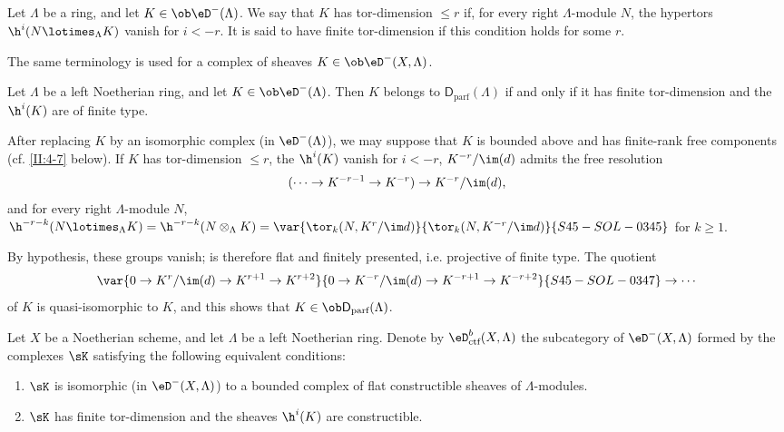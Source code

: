 \subsection{}\label{II:4-5}

Let $\Lambda$ be a ring, and let $K\in\ob\eD^-(\Lambda)$. We say that $K$
has tor-dimension $\leqslant r$ if, for every right $\Lambda$-module $N$, the
hypertors $\h^i(N\lotimes_\Lambda K)$ vanish for $i<-r$. It is said to have
finite tor-dimension if this condition holds for some $r$.

The same terminology is used for a complex of sheaves
$K\in\ob\eD^-(X,\Lambda)$.






\begin{lemma}\label{II:4-5-1}
Let $\Lambda$ be a left Noetherian ring, and let
$K\in\ob\eD^-(\Lambda)$. Then $K$ belongs to
$\mathsf{D}_\text{parf}(\Lambda)$ if and only if it has finite tor-dimension
and the $\h^i(K)$ are of finite type.
\end{lemma}

After replacing $K$ by an isomorphic complex (in $\eD^-(\Lambda)$), we may
suppose that $K$ is bounded above and has finite-rank free components (cf.
\ref{II:4-7} below). If $K$ has tor-dimension $\leqslant r$, the
$\h^i(K)$ vanish for $i<-r$, $K^{-r}/\im(d)$ admits the free resolution
\[
  (\cdots \to K^{-r-1} \to K^{-r}) \to K^{-r}/\im(d) \text{,}
\]
and for every right $\Lambda$-module $N$,
$\h^{-r-k}(N\lotimes_\Lambda K) = \h^{-r-k}(N\otimes_\Lambda K)
= \var{\tor_k(N,K^r/\im d)}{\tor_k(N,K^{-r}/\im d)}{S45-SOL-0345}$ for $k\geqslant 1$.

By hypothesis, these groups vanish;  is therefore
flat and finitely presented, i.e. projective of finite type. The quotient
\[
  \var{0 \to K^r/\im(d) \to K^{r+1} \to K^{r+2}}{0 \to K^{-r}/\im(d) \to K^{-r+1} \to K^{-r+2}}{S45-SOL-0347}\to \cdots
\]
of $K$ is quasi-isomorphic to $K$, and this shows that
$K\in\ob\mathsf{D}_\text{parf}(\Lambda)$.






\begin{prop-def_}\label{II:4-6}
Let $X$ be a Noetherian scheme, and let $\Lambda$ be a left Noetherian ring.
Denote by $\eD_\textnormal{ctf}^b(X,\Lambda)$ the subcategory of
$\eD^-(X,\Lambda)$ formed by the complexes $\sK$ satisfying the following
equivalent conditions:
\begin{enumerate}[\indent i)]
  \item $\sK$ is isomorphic (in $\eD^-(X,\Lambda)$) to a bounded complex of
    flat constructible sheaves of $\Lambda$-modules.
  \item $\sK$ has finite tor-dimension and the sheaves $\h^i(K)$ are
    constructible.
\end{enumerate}
\end{prop-def_}

